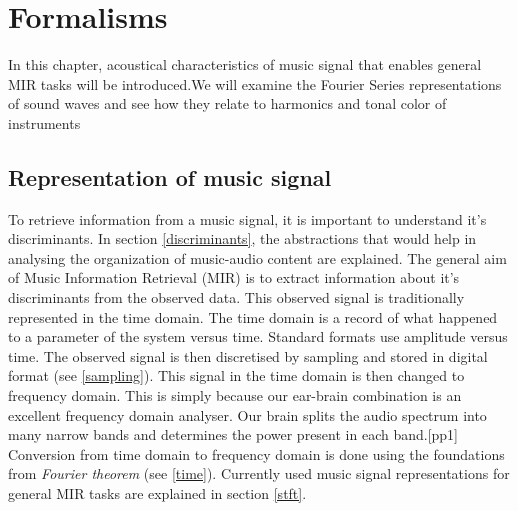 


\chapter{Formalisms} %

\label{Chapter2} %



In this chapter, acoustical characteristics of music signal that enables general MIR tasks will be introduced.We will examine the Fourier Series representations of sound waves and see how they relate to harmonics and tonal color of instruments  




\section{Representation of music signal}

To retrieve information from a music signal, it is important to understand it's discriminants. In section \ref{discriminants}, the abstractions that would help in analysing the organization of music-audio content are explained. The general aim of Music Information Retrieval (MIR) is to extract information about it's discriminants from the observed data. This observed signal is traditionally represented in the time domain. The time domain is a record of what happened to a parameter of the system versus time. Standard formats use amplitude versus time. The observed signal is then discretised by sampling and stored in digital format (see \ref{sampling}). This signal in the time domain is then changed to frequency domain. This is simply because our ear-brain combination is an excellent frequency domain analyser. Our brain splits the audio spectrum into many narrow bands and determines the power present in each band.[pp1] Conversion from time domain to frequency domain is done using the foundations from \textit{Fourier theorem} (see \ref{time}). Currently used music signal representations for general MIR tasks are explained in section \ref{stft}.


